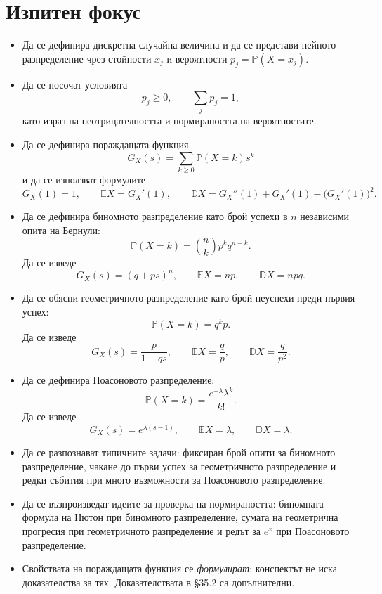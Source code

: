 \section{Изпитен фокус}\label{s:35.7}

\begin{itemize}
\item Да се дефинира дискретна случайна величина и да се представи нейното разпределение чрез стойности $x_j$ и вероятности $p_j=\mathbb{P}(X=x_j)$.

\item Да се посочат условията
\[
p_j\geq0,
\qquad
\sum_jp_j=1,
\]
като израз на неотрицателността и нормираността на вероятностите.

\item Да се дефинира пораждащата функция
\[
G_X(s)=\sum_{k\geq0}\mathbb{P}(X=k)s^k
\]
и да се използват формулите
\[
G_X(1)=1,\qquad
\mathbb{E}X=G_X'(1),\qquad
\mathbb{D}X=G_X''(1)+G_X'(1)-\bigl(G_X'(1)\bigr)^2.
\]

\item Да се дефинира биномното разпределение като брой успехи в $n$ независими опита на Бернули:
\[
\mathbb{P}(X=k)=\binom{n}{k}p^kq^{n-k}.
\]
Да се изведе
\[
G_X(s)=(q+ps)^n,
\qquad
\mathbb{E}X=np,
\qquad
\mathbb{D}X=npq.
\]

\item Да се обясни геометричното разпределение като брой неуспехи преди първия успех:
\[
\mathbb{P}(X=k)=q^kp.
\]
Да се изведе
\[
G_X(s)=\frac{p}{1-qs},
\qquad
\mathbb{E}X=\frac{q}{p},
\qquad
\mathbb{D}X=\frac{q}{p^2}.
\]

\item Да се дефинира Поасоновото разпределение:
\[
\mathbb{P}(X=k)=\frac{e^{-\lambda}\lambda^k}{k!}.
\]
Да се изведе
\[
G_X(s)=e^{\lambda(s-1)},
\qquad
\mathbb{E}X=\lambda,
\qquad
\mathbb{D}X=\lambda.
\]

\item Да се разпознават типичните задачи: фиксиран брой опити за биномното разпределение, чакане до първи успех за геометричното разпределение и редки събития при много възможности за Поасоновото разпределение.

\item Да се възпроизведат идеите за проверка на нормираността: биномната формула на Нютон при биномното разпределение, сумата на геометрична прогресия при геометричното разпределение и редът за $e^x$ при Поасоновото разпределение.

\item Свойствата на пораждащата функция се \emph{формулират}; конспектът не иска доказателства за тях. Доказателствата в \S35.2 са допълнителни.
\end{itemize}
